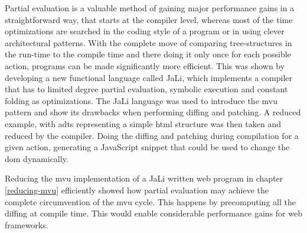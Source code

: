 Partial evaluation is a valuable method of gaining major performance gains in a straightforward way, that starts at the compiler level, whereas most of the time optimizations are searched in the coding style of a program or in using clever architectural patterns.
With the complete move of comparing tree-structures in the run-time to the compile time and there doing it only once for each possible action, programs can be made significantly more efficient. 
This was shown by developing a new functional language called JaLi, which implements a compiler that has to limited degree partial evaluation, symbolic execution and constant folding as optimizations.
The JaLi language was used to introduce the \gls{mvu} pattern and show its drawbacks when performing diffing and patching. A reduced example, with \glspl{adt} representing a simple \gls{html} structure was then taken and reduced by the compiler. Doing the diffing and patching during compilation for a given action, generating a JavaScript snippet that could be used to change the \gls{dom} dynamically.

Reducing the \gls{mvu} implementation of a JaLi written web program in chapter \ref{reducing-mvu} efficiently showed how partial evaluation may achieve the complete circumvention of the \gls{mvu} cycle. This happens by precomputing all the diffing at compile time. This would enable considerable performance gains for web frameworks.

